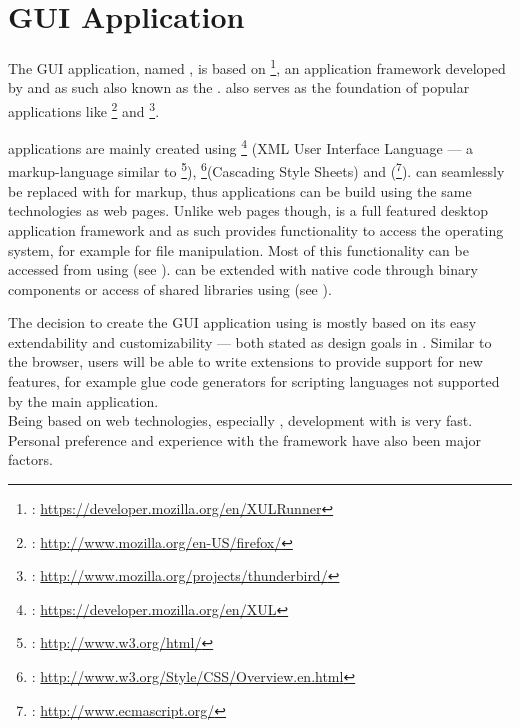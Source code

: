 \chapter{GUI Application}
\label{chap:GUIApplication}

The GUI application, named , is based on \footnote{: \url{https://developer.mozilla.org/en/XULRunner}}, an application \linebreak framework developed by  and as such also known as the . \linebreak{} also serves as the foundation of popular applications like \linebreak{}\footnote{: \url{http://www.mozilla.org/en-US/firefox/}} and \footnote{: \url{http://www.mozilla.org/projects/thunderbird/}}. 

 applications are mainly created using \footnote{: \url{https://developer.mozilla.org/en/XUL}} (XML User Interface \linebreak Language --- a markup-language similar to \footnote{: \url{http://www.w3.org/html/}}), \footnote{: \url{http://www.w3.org/Style/CSS/Overview.en.html}}(Cascading Style Sheets) and  (\footnote{: \url{http://www.ecmascript.org/}}).  can seamlessly be replaced with  for markup, thus  applications can be build using the same technologies as web pages. Unlike web pages though,  is a full featured desktop application framework and as such provides functionality to access the operating system, for example for file manipulation. Most of this functionality can be accessed from  using  (see ).  can be extended with native code through  binary components or access of shared libraries using  (see ).

The decision to create the GUI application using  is mostly based on its easy extendability and customizability --- both stated as design goals in . Similar to the  browser, users will be able to write extensions to provide support for new features, for example glue code generators for scripting languages not supported by the main application.\\
Being based on web technologies, especially , development with   is very fast.
\\Personal preference and experience with the framework have also been major factors.

